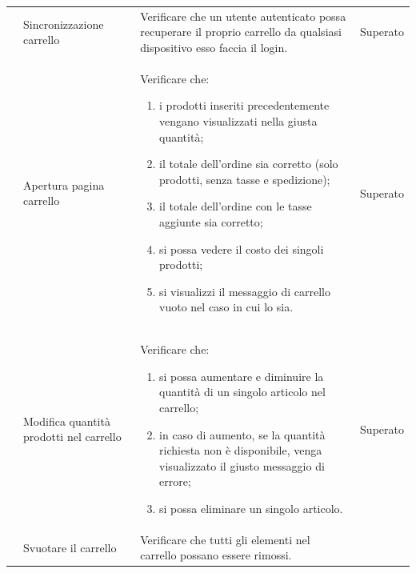 \begin{center}
\begin{longtable}{|p{0.85cm}|p{2.25cm}|p{9cm}|p{3cm}|}
		 & Sincronizzazione carrello & Verificare che un utente autenticato possa recuperare il proprio carrello da qualsiasi dispositivo esso faccia il login. & Superato\\

		 & Apertura pagina carrello & Verificare che: 
		\begin{enumerate}
			\item i prodotti inseriti precedentemente vengano visualizzati nella giusta quantità;
			\item il totale dell'ordine sia corretto (solo prodotti, senza tasse e spedizione);
			\item il totale dell'ordine con le tasse aggiunte sia corretto;
			\item si possa vedere il costo dei singoli prodotti;
			\item si visualizzi il messaggio di carrello vuoto nel caso in cui lo sia.
		\end{enumerate}  & Superato\\

		 & Modifica quantità prodotti nel carrello & Verificare che:
		\begin{enumerate}
			\item si possa aumentare e diminuire la quantità di un singolo articolo nel carrello;
			\item in caso di aumento, se la quantità richiesta non è disponibile, venga visualizzato il giusto messaggio di errore;
			\item si possa eliminare un singolo articolo.
		\end{enumerate} & Superato\\

		 & Svuotare il carrello & Verificare che tutti gli elementi nel carrello possano essere rimossi. \\


\end{longtable}
\end{center}
